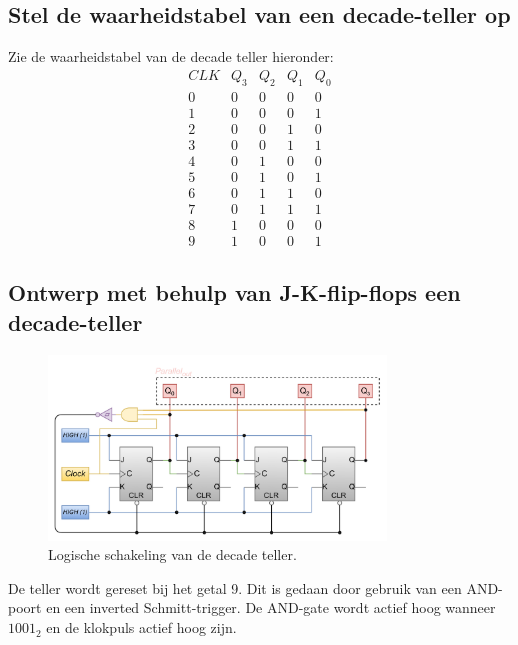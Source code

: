 \documentclass[12pt]{article}
\begin{document}
\subsection{Stel de waarheidstabel van een decade-teller op}
\label{lol}
Zie de waarheidstabel van de decade teller hieronder:
\begin{displaymath}
    \begin{array}{|c||c|c|c|c|}
    CLK & Q_3 & Q_2 & Q_1 & Q_0 \\
    \hline 
    0 & 0 & 0 & 0 & 0 \\
    1 & 0 & 0 & 0 & 1 \\
    2 & 0 & 0 & 1 & 0 \\
    3 & 0 & 0 & 1 & 1 \\
    4 & 0 & 1 & 0 & 0 \\
    5 & 0 & 1 & 0 & 1 \\
    6 & 0 & 1 & 1 & 0 \\
    7 & 0 & 1 & 1 & 1 \\
    8 & 1 & 0 & 0 & 0 \\
    9 & 1 & 0 & 0 & 1 
  \end{array}
    \end{displaymath}
\subsection{Ontwerp met behulp van J-K-flip-flops een decade-teller}
\begin{figure}[h]
    \centering
    \includegraphics[width=0.8\textwidth]{9mod.png}
    \caption{Logische schakeling van de decade teller.}
    \label{fig:9mod}
\end{figure}
De teller wordt gereset bij het getal 9. Dit is gedaan door gebruik van een AND-poort en een inverted Schmitt-trigger. De AND-gate wordt actief hoog wanneer $1001_2$ en de klokpuls actief hoog zijn.
\pagebreak
\end{document}
